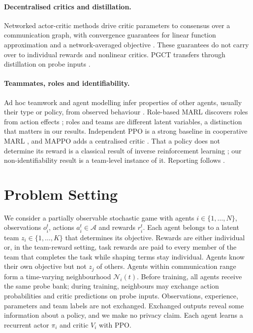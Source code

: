 \documentclass{article}
\theoremstyle{remark}
\newcommand{\ours}{PGCT}
\begin{document}
\paragraph{Decentralised critics and distillation.} Networked actor-critic methods drive critic parameters to consensus over
a communication graph, with convergence guarantees for linear function approximation and a network-averaged objective
\cite{zhang2018networked}. These guarantees do not carry over to individual rewards and nonlinear critics. \ours{} transfers
through distillation on probe inputs \cite{rusu2016policy}.

\paragraph{Teammates, roles and identifiability.} Ad hoc teamwork and agent modelling infer properties of other agents,
usually their type or policy, from observed behaviour \cite{stone2010adhoc,albrecht2018modelling}. Role-based MARL discovers
roles from action effects \cite{wang2021rode}; roles and teams are different latent variables, a distinction that matters in
our results. Independent PPO is a strong baseline in cooperative MARL \cite{schulman2017ppo,dewitt2020ippo}, and MAPPO adds
a centralised critic \cite{yu2022mappo}. That a policy does not determine its reward is a classical result of inverse
reinforcement learning \cite{ng2000irl}; our non-identifiability result is a team-level instance of it. Reporting follows
\cite{agarwal2021precipice}.

\section{Problem Setting}
\label{sec:setting}
We consider a partially observable stochastic game with agents $i\in\{1,\dots,N\}$, observations $o_i^t$, actions
$a_i^t\in\mathcal{A}$ and rewards $r_i^t$. Each agent belongs to a latent team $z_i\in\{1,\dots,K\}$ that determines its
objective. Rewards are either individual or, in the team-reward setting, task rewards are paid to every member of the team
that completes the task while shaping terms stay individual. Agents know their own objective but not $z_j$ of others.
Agents within communication range form a time-varying neighbourhood $\mathcal{N}_i(t)$. Before training, all agents receive
the same probe bank; during training, neighbours may exchange action probabilities and critic predictions on probe inputs.
Observations, experience, parameters and team labels are not exchanged. Exchanged outputs reveal some information about a
policy, and we make no privacy claim. Each agent learns a recurrent actor $\pi_i$ and critic $V_i$ with PPO.
\end{document}
